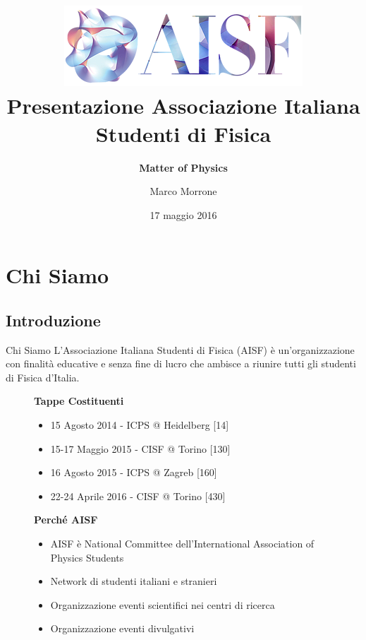 \documentclass{Bredelebeamer}
\title[\textbf{Presentazione AISF}]{\includegraphics[scale=2]{images/aisf.png} \\Presentazione Associazione Italiana Studenti di Fisica}
\subtitle{\textbf{ Matter of Physics}}
\author{Marco Morrone \inst{}}
\institute[Ass. Italiana Studenti di Fisica]
{
  \inst{}%
 {\footnotesize Event Coordinator \\ \textit{ marco.morrone@ai-sf.it}}
  }
\date{17 maggio 2016}
\begin{document}
\begin{frame}
  \titlepage
\end{frame}

\section{Chi Siamo}

\begin{frame}
\begin{block}{}
\end{block}
\end{frame} 
\subsection{Introduzione}
\begin{frame}{Chi Siamo}
L'\thinspace Associazione Italiana Studenti di Fisica (AISF) è un'organizzazione con finalità educative e senza fine di lucro che ambisce a riunire tutti gli studenti di Fisica d'Italia.
\begin{figure}
\begin{block}{\centering \textbf{Tappe Costituenti}}
\begin{itemize}
\item 15 Agosto 2014 - ICPS @ Heidelberg  [14]
\item 15-17 Maggio 2015 - CISF @ Torino [130]
\item 16 Agosto 2015 - ICPS @ Zagreb [160]
\item 22-24 Aprile 2016 - CISF @ Torino [430]
\end{itemize}
\end{block}
\begin{block}{\centering \textbf{Perché AISF}}
\begin{itemize}
\item AISF è National Committee dell'International Association of Physics Students
\item Network di studenti italiani e stranieri
\item Organizzazione eventi scientifici nei centri di ricerca
\item Organizzazione eventi divulgativi
\end{itemize}
\end{block}
\end{figure}
\end{frame}
\end{document}
